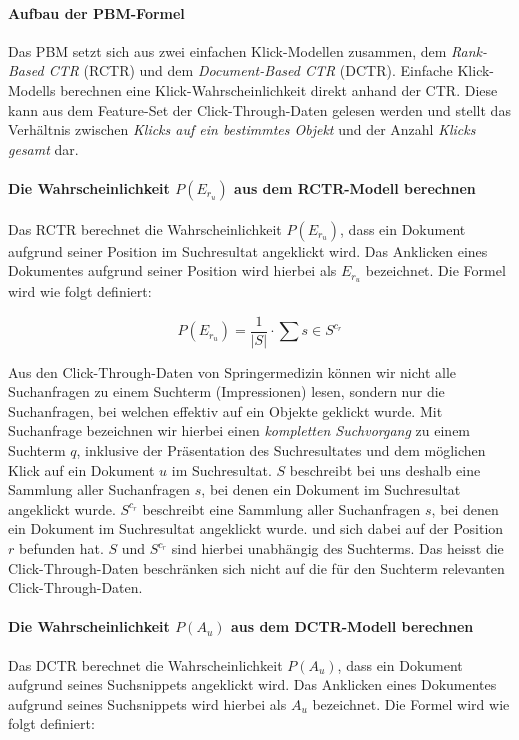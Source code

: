 \paragraph{Aufbau der PBM-Formel}
Das PBM setzt sich aus zwei einfachen Klick-Modellen zusammen, dem \textit{Rank-Based CTR} (RCTR) und dem \textit{Document-Based CTR} (DCTR). Einfache Klick-Modells berechnen eine Klick-Wahrscheinlichkeit direkt anhand der CTR. Diese kann aus dem Feature-Set der Click-Through-Daten gelesen werden und stellt das Verhältnis zwischen \textit{Klicks auf ein bestimmtes Objekt} und der Anzahl \textit{Klicks gesamt} dar. 

\paragraph{Die Wahrscheinlichkeit $P(E_{r_{u}})$ aus dem RCTR-Modell berechnen}
Das RCTR berechnet die Wahrscheinlichkeit $P(E_{r_{u}})$, dass ein Dokument aufgrund seiner Position im Suchresultat angeklickt wird. Das Anklicken eines Dokumentes aufgrund seiner Position wird hierbei als $E_{r_{u}}$ bezeichnet. Die Formel wird wie folgt definiert:

\vspace{-1.5em}
\begin{equation}	
	P(E_{r_{u}}) = \frac{1}{\vert S \vert} \cdot \sum{s \in S^{c_r}}
\end{equation}
\vspace{-1em}

Aus den Click-Through-Daten von Springermedizin können wir nicht alle Suchanfragen zu einem Suchterm (Impressionen) lesen, sondern nur die Suchanfragen, bei welchen effektiv auf ein Objekte geklickt wurde. Mit Suchanfrage bezeichnen wir hierbei einen \textit{kompletten Suchvorgang} zu einem Suchterm $q$, inklusive der Präsentation des Suchresultates und dem möglichen Klick auf ein Dokument $u$ im Suchresultat. $S$ beschreibt bei uns deshalb eine Sammlung aller Suchanfragen $s$, bei denen ein Dokument im Suchresultat angeklickt wurde. $S^{c_r}$ beschreibt eine Sammlung aller Suchanfragen $s$, bei denen ein Dokument im Suchresultat angeklickt wurde. und sich dabei auf der Position $r$ befunden hat. $S$ und $S^{c_r}$ sind hierbei unabhängig des Suchterms. Das heisst die Click-Through-Daten beschränken sich nicht auf die für den Suchterm relevanten Click-Through-Daten.  

\paragraph{Die Wahrscheinlichkeit $P(A_{u})$ aus dem DCTR-Modell berechnen}
Das DCTR berechnet die Wahrscheinlichkeit $P(A_{u})$, dass ein Dokument aufgrund seines Suchsnippets angeklickt wird. Das Anklicken eines Dokumentes aufgrund seines Suchsnippets wird hierbei als $A_{u}$ bezeichnet. Die Formel wird wie folgt definiert:

